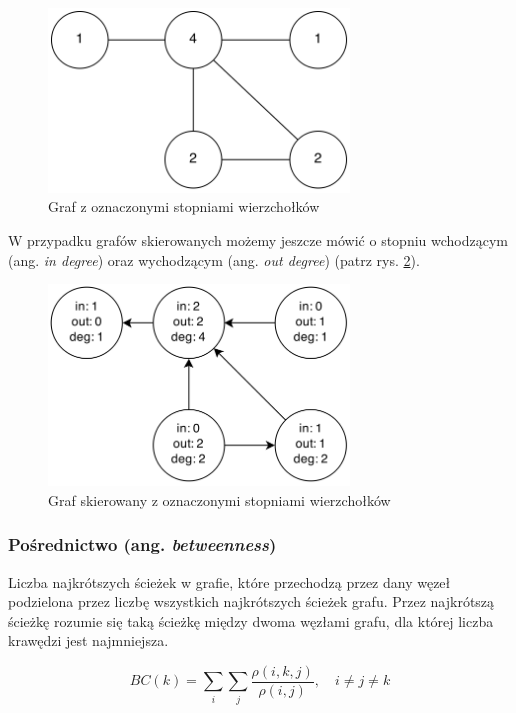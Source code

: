 \begin{figure}[ht!]
\centering
\includegraphics[width=80mm]{img/stopien-wierzcholka.png}
\caption{Graf z oznaczonymi stopniami wierzchołków}
\label{image:stopien-wierzcholka}
\end{figure}

W przypadku grafów skierowanych możemy jeszcze mówić o stopniu wchodzącym 
(ang. \textit{in degree}) oraz wychodzącym (ang. \textit{out degree}) 
(patrz rys. \ref{image:stopien-wierzcholka-skierowany}).
  
\clearpage
\begin{figure}[ht!]
\centering
\includegraphics[width=80mm]{img/stopien-wierzcholka-skierowany.png}
\caption{Graf skierowany z oznaczonymi stopniami wierzchołków}
\label{image:stopien-wierzcholka-skierowany}
\end{figure}
  
  
\subsubsection{Pośrednictwo (ang. \textit{betweenness}) }  
Liczba najkrótszych ścieżek w grafie, które przechodzą przez dany węzeł podzielona
przez liczbę wszystkich najkrótszych ścieżek grafu. Przez najkrótszą ścieżkę 
rozumie się taką ścieżkę między dwoma węzłami grafu, dla której liczba krawędzi
jest najmniejsza.
  
\begin{equation}
BC(k) = \sum\limits_{i}\sum\limits_{j}\frac{\rho(i, k, j)}{\rho(i, j)}, \quad i \neq j \neq k
\end{equation}

